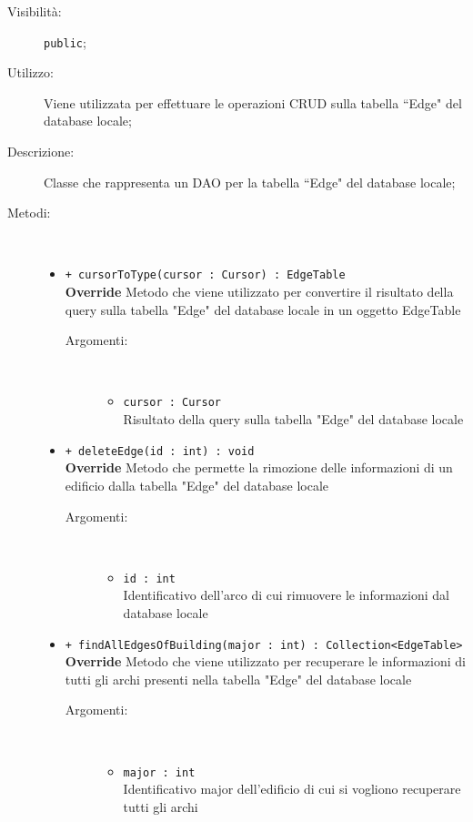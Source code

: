 \documentclass[../DefinizioneDiProdotto.tex]{subfiles}
\begin{document}
\begin{description}
\begin{itemize}
\end{itemize}
\item[Visibilità:] \texttt{public};
\item[Utilizzo:] Viene utilizzata per effettuare le operazioni CRUD sulla tabella “Edge" del database locale;
\item[Descrizione:] Classe che rappresenta un DAO per la tabella “Edge" del database locale;
\item[Metodi:] \
\begin{itemize}
\item \texttt{+ cursorToType(cursor : Cursor) : EdgeTable}\\
\textbf{Override} Metodo che viene utilizzato per convertire il risultato della query sulla tabella "Edge" del database locale in un oggetto EdgeTable
 \begin{description}
\item[Argomenti:] \
\begin{itemize}
\item \texttt{cursor : Cursor}\\
Risultato della query sulla tabella "Edge" del database locale\end{itemize}
\end{description}
\item \texttt{+ deleteEdge(id : int) : void}\\
\textbf{Override} Metodo che permette la rimozione delle informazioni di un edificio dalla tabella "Edge" del database locale 
 \begin{description}
\item[Argomenti:] \
\begin{itemize}
\item \texttt{id : int}\\
Identificativo dell'arco di cui rimuovere le informazioni dal database locale\end{itemize}
\end{description}
\item \texttt{+ findAllEdgesOfBuilding(major : int) : Collection<EdgeTable>}\\
\textbf{Override} Metodo che viene utilizzato per recuperare le informazioni di tutti gli archi presenti nella tabella "Edge" del database locale
 \begin{description}
\item[Argomenti:] \
\begin{itemize}
\item \texttt{major : int}\\
Identificativo major dell'edificio di cui si vogliono recuperare tutti gli archi\end{itemize}

\end{description}
\end{itemize}
\end{description}
\end{document}
